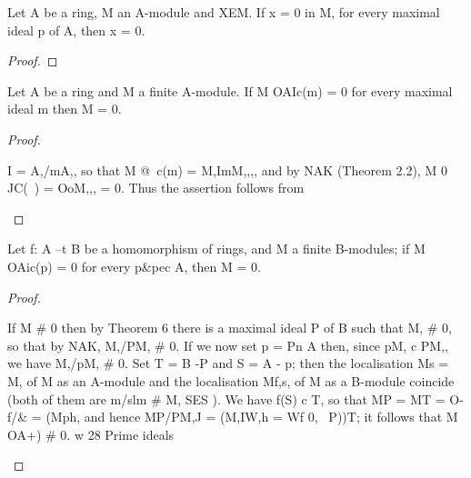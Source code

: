 \begin{theorem}[Theorem 4.6]\label{mcrt-auto-theorem-4-6}
\begin{mathematicalrecord}
Let A be a ring, M an A-module and XEM. If x = 0 in M,
      for every maximal ideal p of A, then x = 0.
\end{mathematicalrecord}
\end{theorem}
\begin{proof}
\end{proof}


\begin{theorem}[Theorem 4.8]\label{mcrt-auto-theorem-4-8}
\begin{mathematicalrecord}
Let A be a ring and M a finite A-module. If M OAIc(m) = 0
      for every maximal ideal m then M = 0.
\end{mathematicalrecord}
\end{theorem}
\begin{proof}
\begin{mathematicalrecord}
I      = A,/mA,,   so that M @~c(m) = M,ImM,,,,   and by NAK
      (Theorem 2.2), M 0 JC(~) = OoM,,, = 0. Thus the assertion follows from
\end{mathematicalrecord}
\end{proof}


\begin{theorem}[Theorem 4.9]\label{mcrt-auto-theorem-4-9}\uses{}
\begin{mathematicalrecord}
Let f: A --t B be a homomorphism     of rings, and M a finite
      B-modules; if M OAic(p) = 0 for every p&pec A, then M = 0.
\end{mathematicalrecord}
\end{theorem}
\begin{proof}
\begin{mathematicalrecord}
If M # 0 then by Theorem 6 there is a maximal ideal P of B such
      that M, # 0, so that by NAK, M,/PM,     # 0. If we now set p = Pn A then,
      since pM, c PM,, we have M,/pM,       # 0. Set T = B -P and S = A - p;
      then the localisation Ms = M, of M as an A-module and the localisation
      Mf,s, of M as a B-module coincide (both of them are {m/slm # M, SES} ).
      We have f(S) c T, so that
              MP = MT = O-f/&       = (Mph,
      and hence
                MP/PM,J = (M,IW,h      = Wf 0, ~P))T;
      it follows that M OA+) # 0.       w
28         Prime ideals
\end{mathematicalrecord}
\end{proof}


